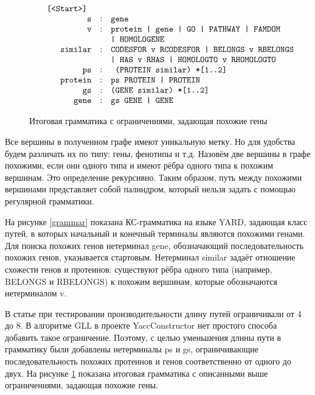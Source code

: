 \documentclass[14pt]{matmex-diploma}
\begin{document}
\begin{figure}
$$
\begin{array}{crcl}
&\mbox{\texttt{ [<Start>] }} \\
&\mbox{\texttt{s}} &:& \mbox{\texttt{gene }} \\
&\mbox{\texttt{v}} &:& \mbox{\texttt{protein | gene | GO | PATHWAY | FAMDOM}} \\
&&&\mbox{\texttt{| HOMOLOGENE}} \\
&\mbox{\texttt{similar}} &:& \mbox{\texttt{CODESFOR v RCODESFOR | BELONGS v RBELONGS}} \\
&&&\mbox{\texttt{| HAS v RHAS | HOMOLOGTO v RHOMOLOGTO}} \\
&\mbox{\texttt{ps}} & :& \mbox{\texttt{ (PROTEIN similar) *[1..2]}} \\
&\mbox{\texttt{protein}} & :& \mbox{\texttt{ps PROTEIN | PROTEIN}} \\
&\mbox{\texttt{gs}} & :& \mbox{\texttt{(GENE similar) *[1..2]}} \\
&\mbox{\texttt{gene}} & :& \mbox{\texttt{gs GENE | GENE}} \\
\end{array}
$$
\caption{Итоговая грамматика с ограничениями, задающая похожие гены}
\label{finalgrammar}
\end{figure}

Все вершины в полученном графе имеют уникальную метку. Но для удобства будем различать их по типу: гены, фенотипы и т.д. Назовём две вершины в графе похожими, если они одного типа и имеют рёбра одного типа к похожим вершинам. Это определение рекурсивно. Таким образом, путь между похожими вершинами представляет собой палиндром, который нельзя задать с помощью регулярной грамматики. 

На рисунке \ref{grammar} показана КС-грамматика на языке YARD, задающая класс путей, в которых начальный и конечный терминалы являются похожими генами. Для поиска похожих генов нетерминал gene, обозначающий последовательность похожих генов, указывается стартовым. Нетерминал similar задаёт отношение схожести генов и протеинов: существуют рёбра одного типа (например, BELONGS и RBELONGS) к похожим вершинам, которые обозначаются нетерминалом v.

В статье \cite{subgraph} при тестировании производительности длину путей ограничивали от 4 до 8. В алгоритме GLL в проекте YaccConstructor нет простого способа добавить такое ограничение. Поэтому, с целью уменьшения длины пути в грамматику были добавлены нетерминалы ps и gs, ограничивающие последовательность похожих протеинов и генов соответственно от одного до двух. На рисунке \ref{finalgrammar} показана итоговая грамматика с описанными выше ограничениями, задающая похожие гены.
\end{document}
